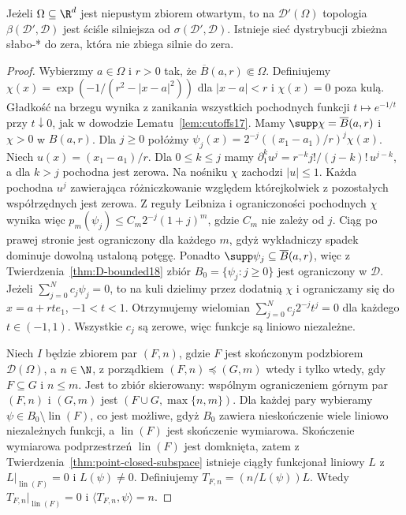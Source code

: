 \begin{twierdzenie}
\label{thm:weak-strong-different19}
Jeżeli $\Omega\subseteq\R^d$ jest niepustym zbiorem
otwartym, to na $\mathcal D'(\Omega)$ topologia
$\beta(\mathcal D',\mathcal D)$ jest ściśle silniejsza
od $\sigma(\mathcal D',\mathcal D)$. Istnieje sieć
dystrybucji zbieżna słabo-* do zera, która nie
zbiega silnie do zera.
\end{twierdzenie}
\begin{proof}
Wybierzmy $a\in\Omega$ i $r>0$ tak, że
$\overline B(a,r)\Subset\Omega$. Definiujemy
$\chi(x)=\exp(-1/(r^2-|x-a|^2))$ dla $|x-a|<r$
i $\chi(x)=0$ poza kulą.
Gładkość na brzegu wynika z zanikania wszystkich pochodnych
funkcji $t\mapsto e^{-1/t}$ przy $t\downarrow0$,
jak w dowodzie Lematu~\ref{lem:cutoffs17}.
Mamy $\supp\chi=\overline B(a,r)$ i $\chi>0$ w $B(a,r)$.
Dla $j\ge0$ połóżmy
$\psi_j(x)=2^{-j}((x_1-a_1)/r)^j\chi(x)$.
Niech $u(x)=(x_1-a_1)/r$. Dla $0\le k\le j$ mamy
$\partial_1^k u^j=r^{-k}j!/(j-k)!\,u^{j-k}$,
a dla $k>j$ pochodna jest zerowa.
Na nośniku $\chi$ zachodzi $|u|\le1$.
Każda pochodna $u^j$ zawierająca różniczkowanie względem
którejkolwiek z pozostałych współrzędnych jest zerowa.
Z reguły Leibniza i ograniczoności pochodnych $\chi$
wynika więc $p_m(\psi_j)\le C_m 2^{-j}(1+j)^m$,
gdzie $C_m$ nie zależy od $j$. Ciąg po prawej stronie
jest ograniczony dla każdego $m$, gdyż wykładniczy
spadek dominuje dowolną ustaloną potęgę.
Ponadto $\supp\psi_j\subseteq\overline B(a,r)$,
więc z Twierdzenia~\ref{thm:D-bounded18}
zbiór $B_0=\{\psi_j:j\ge0\}$ jest ograniczony w $\mathcal D$.
Jeżeli $\sum_{j=0}^N c_j\psi_j=0$, to na kuli dzielimy
przez dodatnią $\chi$ i ograniczamy się do $x=a+rt e_1$,
$-1<t<1$. Otrzymujemy wielomian
$\sum_{j=0}^N c_j2^{-j}t^j=0$ dla każdego $t\in(-1,1)$.
Wszystkie $c_j$ są zerowe, więc funkcje są liniowo niezależne.

Niech $I$ będzie zbiorem par $(F,n)$, gdzie $F$ jest
skończonym podzbiorem $\mathcal D(\Omega)$, a $n\in\N$,
z porządkiem $(F,n)\preceq(G,m)$ wtedy i tylko wtedy,
gdy $F\subseteq G$ i $n\le m$. Jest to zbiór skierowany:
wspólnym ograniczeniem górnym par $(F,n)$ i $(G,m)$
jest $(F\cup G,\max\{n,m\})$.
Dla każdej pary wybieramy $\psi\in B_0\setminus\operatorname{lin}(F)$,
co jest możliwe, gdyż $B_0$ zawiera nieskończenie wiele
liniowo niezależnych funkcji, a $\operatorname{lin}(F)$
jest skończenie wymiarowa.
Skończenie wymiarowa podprzestrzeń
$\operatorname{lin}(F)$ jest domknięta, zatem
z Twierdzenia~\ref{thm:point-closed-subspace}
istnieje ciągły funkcjonał liniowy $L$ z
$L|_{\operatorname{lin}(F)}=0$ i $L(\psi)\ne0$.
Definiujemy $T_{F,n}=(n/L(\psi))L$. Wtedy
$T_{F,n}|_{\operatorname{lin}(F)}=0$ i
$\langle T_{F,n},\psi\rangle=n$.


\end{proof}
